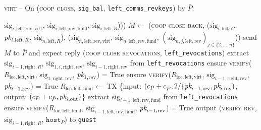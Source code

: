 \begin{center}
\begin{processbox}{\textsc{virt} -- On (\textsc{coop close},
  \texttt{sig\_bal}, \texttt{left\_comms\_revkeys}) by $\bar{P}$:}
\begin{algorithmic}[1]
        $\mathrm{sig}_{i, \mathrm{left}, \mathrm{rev}, \mathrm{virt}}$,
        $\mathrm{sig}_{i, \mathrm{left}, \mathrm{rev}, \mathrm{fund}}$,
        $\mathrm{sig}_{i, \mathrm{left}, R}$)))
      \Else \: 
        \State $M \gets$ (\textsc{coop close back}, ($\mathrm{sig}_{i,
        \mathrm{left}, C}$, $\textit{pk}_{i, \mathrm{left}, R}$,  $\mathrm{sig}_{n,
        \mathrm{left}, R}$), ($\mathrm{sig}_{n, \mathrm{left}, \mathrm{rev},
        \mathrm{virt}}$, $\mathrm{sig}_{n, \mathrm{left}, \mathrm{rev},
        \mathrm{fund}}$, $(\mathrm{sig}_{n, j, \mathrm{left}, \mathrm{rev}})_{j
        \in \{2, \dots, n\}}$))
      \EndIf
      \State send $M$ to $\bar{P}$ and expect reply (\textsc{coop close
      revocations}, \texttt{left\_revocations})
      \State extract $\mathrm{sig}_{i-1, \mathrm{right}, R}$,
      $\mathrm{sig}_{1, i, \mathrm{right}, \mathrm{rev}}$, $\mathrm{sig}_{i-1,
      \mathrm{right}, \mathrm{rev}}$ from \texttt{left\_revocations}
      \State ensure \textsc{verify}($R_{\mathrm{loc}, \mathrm{left},
      \mathrm{virt}}$,
      $\mathrm{sig}_{1, \mathrm{right}, \mathrm{rev}}$, $\textit{pk}_{1, \mathrm{rev}}$)
      = True
      \label{code:virtual-layer:coop-close-intermediary:verify-left-virt-rev-start}
      \State ensure \textsc{verify}($R_{\mathrm{loc}, \mathrm{left},
      \mathrm{virt}}$,
      $\mathrm{sig}_{i-1, \mathrm{right}, \mathrm{rev}}$, $\textit{pk}_{i-1,
      \mathrm{rev}}$) = True
      \label{code:virtual-layer:coop-close-intermediary:verify-left-virt-rev-left}
      \State $R_{\mathrm{loc}, \mathrm{left}, \mathrm{fund}} \gets$ TX
      \{input: $(c_P + c_{\bar{P}}, 2/\{\textit{pk}_{i-1,
      \mathrm{rev}}, \textit{pk}_{i, \mathrm{rev}})$, output:
      $(c_P + c_{\bar{P}}, \textit{pk}_{i, \mathrm{out}})$\} 
      \State extract $\mathrm{sig}_{i-1, \mathrm{left}, \mathrm{rev},
      \mathrm{fund}}$ from \texttt{left\_revocations}
      \State ensure \textsc{verify}($R_{\mathrm{loc}, \mathrm{left},
      \mathrm{fund}}$, $\mathrm{sig}_{i-1, \mathrm{left}, \mathrm{rev},
      \mathrm{fund}}$, $\textit{pk}_{i-1, \mathrm{rev}}$) = True
      \label{code:virtual-layer:coop-close-intermediary:verify-left-fund-rev}
      \State output (\textsc{verify rev}, $\mathrm{sig}_{i-1, \mathrm{right},
      R}$, $\texttt{host}_P$) to \texttt{guest}
      \State {} 
      \State {}
\end{algorithmic}
\end{processbox}
\end{center}
